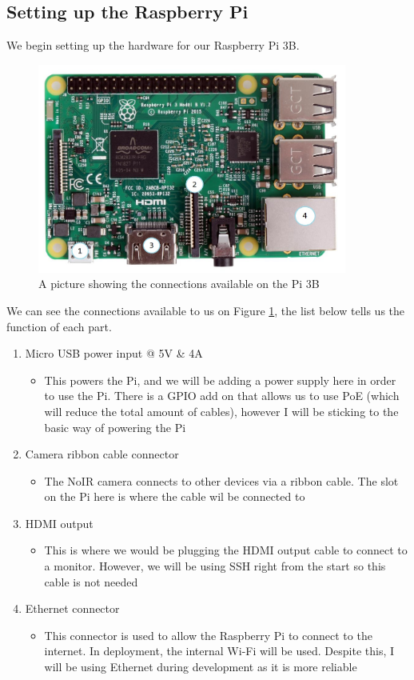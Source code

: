 \documentclass[9pt]{article}
\begin{document}
\subsection{Setting up the Raspberry Pi}
We begin setting up the hardware for our Raspberry Pi 3B.
\begin{figure}[H]
	\centering
	\includegraphics[width=4in]{raspberryPi.jpg}
	\caption{A picture showing the connections available on the Pi 3B}\label{fig_raspberryPi}
\end{figure}
We can see the connections available to us on Figure \ref{fig_raspberryPi}, the list below tells us the function of each part.
\begin{enumerate}
	\setlength{\itemsep}{4pt}
	\setlength{\parskip}{0pt}
	\item Micro USB power input @ 5V \& 4A
	\begin{itemize}
		\item This powers the Pi, and we will be adding a power supply here in order to use the Pi. There is a GPIO add on that allows us to use PoE (which will reduce the total amount of cables), however I will be sticking to the basic way of powering the Pi
	\end{itemize}
	\item Camera ribbon cable connector
	\begin{itemize}
		\item The NoIR camera connects to other devices via a ribbon cable. The slot on the Pi here is where the cable wil be connected to
	\end{itemize}
	\item HDMI output
	\begin{itemize}
		\item This is where we would be plugging the HDMI output cable to connect to a monitor. However, we will be using SSH right from the start so this cable is not needed
	\end{itemize} 
	\item Ethernet connector
	\begin{itemize}
		\item This connector is used to allow the Raspberry Pi to connect to the internet. In deployment, the internal Wi-Fi will be used. Despite this, I will be using Ethernet during development as it is more reliable
	\end{itemize}
\end{enumerate}
\end{document}
